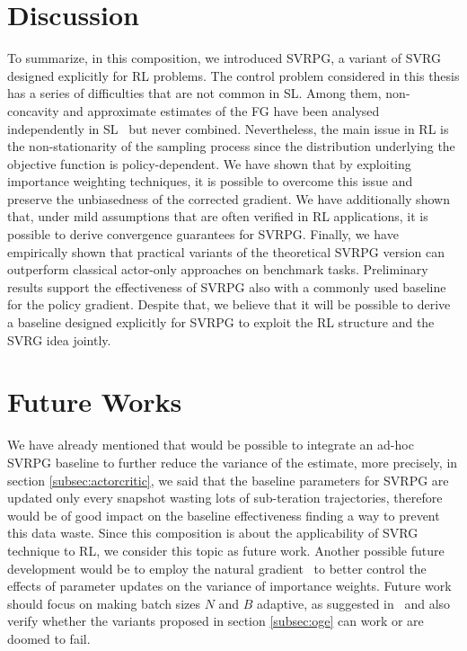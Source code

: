 \section{Discussion}
\vspace{-0.05in}
To summarize, in this composition, we introduced \acs{SVRPG}, a variant of \acs{SVRG} designed explicitly for \acs{RL} problems.
The control problem considered in this thesis has a series of difficulties that are not common in \acs{SL}.
Among them, non-concavity and approximate estimates of the \acs{FG} have been analysed independently in \acs{SL}~\citep[\eg][]{allen2016variance,reddi2016stochastic,harikandeh2015stopwasting} but never combined.
Nevertheless, the main issue in \acs{RL} is the non-stationarity of the sampling process since the distribution underlying the objective function is policy-dependent.
We have shown that by exploiting importance weighting techniques, it is possible to overcome this issue and preserve the unbiasedness of the corrected gradient.
We have additionally shown that, under mild assumptions that are often verified in \acs{RL} applications, it is possible to derive convergence guarantees for \acs{SVRPG}.
Finally, we have empirically shown that practical variants of the theoretical \acs{SVRPG} version can outperform classical actor-only approaches on benchmark tasks.
Preliminary results support the effectiveness of \acs{SVRPG} also with a commonly used baseline for the policy gradient.
Despite that, we believe that it will be possible to derive a baseline designed explicitly for \acs{SVRPG} to exploit the \acs{RL} structure and the \acs{SVRG} idea jointly.
\section{Future Works}
We have already mentioned that would be possible to integrate an ad-hoc \acs{SVRPG} baseline to further reduce the variance of the estimate, more precisely, in section \ref{subsec:actorcritic}, we said that the baseline parameters for \acs{SVRPG} are updated only every snapshot wasting lots of sub-teration trajectories, therefore would be of good impact on the baseline effectiveness finding a way to prevent this data waste. Since this composition is about the applicability of \acs{SVRG} technique to \acs{RL}, we consider this topic as future work.
Another possible future development would be to employ the natural gradient~\cite{kakade2002natural} to better control the effects of parameter updates on the variance of importance weights. Future work should focus on making batch sizes $N$ and $B$ adaptive, as suggested in~\cite{papini2017adaptive} and also verify whether the variants proposed in section \ref{subsec:oge} can work or are doomed to fail.
\vspace{-0.05in}